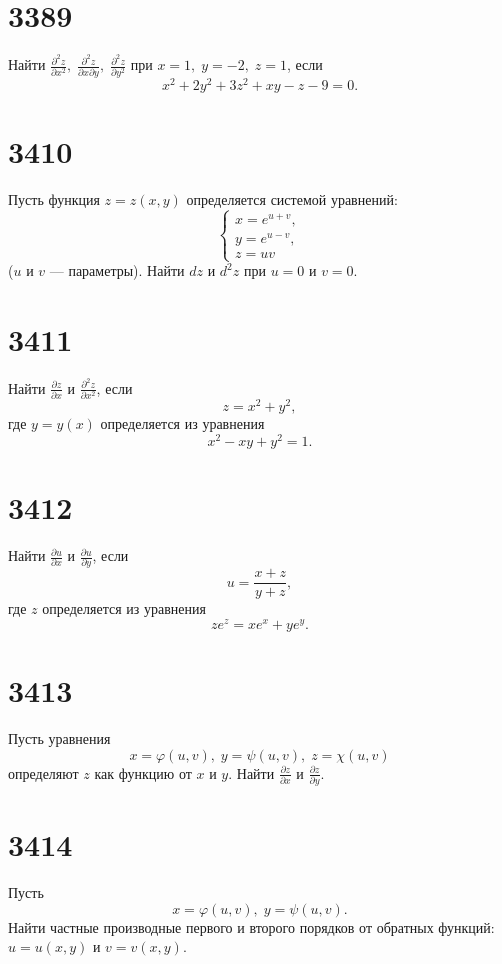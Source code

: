 \documentclass[a4paper,12pt]{article}
\begin{document}
\section*{3389}
Найти \(\displaystyle \frac{\partial^2 z}{\partial x^2},\; \frac{\partial^2 z}{\partial x \partial y},\; \frac{\partial^2 z}{\partial y^2}\) при \(x = 1,\; y = -2,\; z = 1\), если
\[ x^2 + 2y^2 + 3z^2 + xy - z - 9 = 0. \]

\section*{3410}
Пусть функция \(z = z(x, y)\) определяется системой уравнений:
\[
\begin{cases} 
x = e^{u + v}, \\ 
y = e^{u - v}, \\ 
z = uv 
\end{cases}
\]
(\(u\) и \(v\) — параметры). Найти \(dz\) и \(d^2z\) при \(u = 0\) и \(v = 0\).

\section*{3411}
Найти \(\displaystyle \frac{\partial z}{\partial x}\) и \(\displaystyle \frac{\partial^2 z}{\partial x^2}\), если
\[z = x^2 + y^2,\]
где \(y = y(x)\) определяется из уравнения
\[x^2 - xy + y^2 = 1.\]

\section*{3412}
Найти \(\displaystyle \frac{\partial u}{\partial x}\) и \(\displaystyle \frac{\partial u}{\partial y}\), если
\[u = \frac{x + z}{y + z},\]
где \(z\) определяется из уравнения
\[ze^z = xe^x + ye^y.\]

\section*{3413}
Пусть уравнения
\[x = \varphi(u, v),\; y = \psi(u, v),\; z = \chi(u, v)\]
определяют \(z\) как функцию от \(x\) и \(y\). Найти \(\displaystyle \frac{\partial z}{\partial x}\) и \(\displaystyle \frac{\partial z}{\partial y}\).

\section*{3414}
Пусть
\[x = \varphi(u, v),\; y = \psi(u, v).\]
Найти частные производные первого и второго порядков от обратных функций: \(u = u(x, y)\) и \(v = v(x, y)\).
\end{document}
